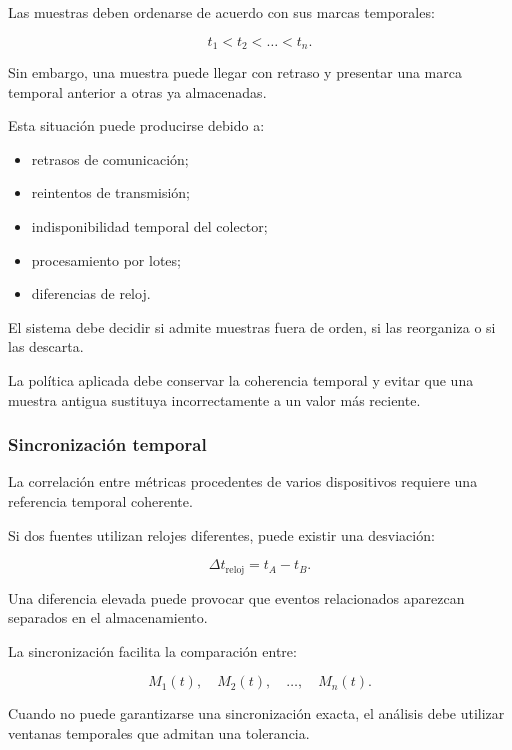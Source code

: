 Las muestras deben ordenarse de acuerdo con sus marcas temporales:

\[
    t_1
    <
    t_2
    <
    \ldots
    <
    t_n.
\]

Sin embargo, una muestra puede llegar con retraso y presentar una marca
temporal anterior a otras ya almacenadas.

Esta situación puede producirse debido a:

\begin{itemize}
    \item retrasos de comunicación;

    \item reintentos de transmisión;

    \item indisponibilidad temporal del colector;

    \item procesamiento por lotes;

    \item diferencias de reloj.
\end{itemize}

El sistema debe decidir si admite muestras fuera de orden, si las
reorganiza o si las descarta.

La política aplicada debe conservar la coherencia temporal y evitar que
una muestra antigua sustituya incorrectamente a un valor más reciente.


\subsubsection*{Sincronización temporal}

La correlación entre métricas procedentes de varios dispositivos requiere
una referencia temporal coherente.

Si dos fuentes utilizan relojes diferentes, puede existir una desviación:

\[
    \Delta t_{\mathrm{reloj}}
    =
    t_A
    -
    t_B.
\]

Una diferencia elevada puede provocar que eventos relacionados aparezcan
separados en el almacenamiento.

La sincronización facilita la comparación entre:

\[
    M_1(t),
    \quad
    M_2(t),
    \quad
    \ldots,
    \quad
    M_n(t).
\]

Cuando no puede garantizarse una sincronización exacta, el análisis debe
utilizar ventanas temporales que admitan una tolerancia.


